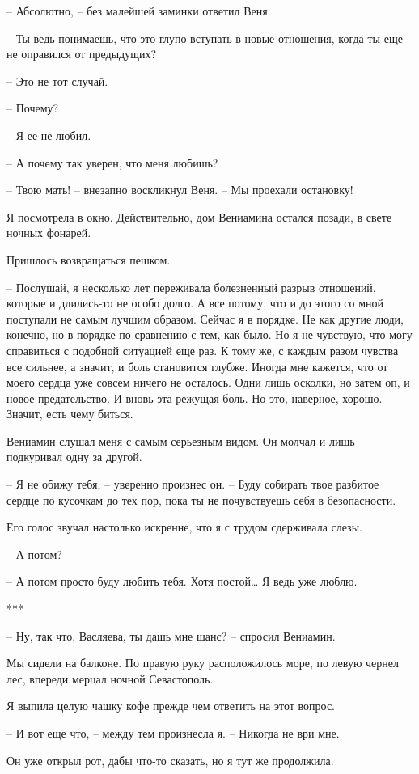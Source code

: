 \documentclass[
]{book}
\begin{document}
-- Абсолютно, -- без малейшей заминки ответил Веня.

-- Ты ведь понимаешь, что это глупо вступать в новые отношения, когда ты еще не оправился от предыдущих?

-- Это не тот случай.

-- Почему?

-- Я ее не любил.

-- А почему так уверен, что меня любишь?

-- Твою мать! -- внезапно воскликнул Веня. -- Мы проехали остановку!

Я посмотрела в окно. Действительно, дом Вениамина остался позади, в свете ночных фонарей.

Пришлось возвращаться пешком.

-- Послушай, я несколько лет переживала болезненный разрыв отношений, которые и длились-то не особо долго. А все потому, что и до этого со мной поступали не самым лучшим образом. Сейчас я в порядке. Не как другие люди, конечно, но в порядке по сравнению с тем, как было. Но я не чувствую, что могу справиться с подобной ситуацией еще раз. К тому же, с каждым разом чувства все сильнее, а значит, и боль становится глубже. Иногда мне кажется, что от моего сердца уже совсем ничего не осталось. Одни лишь осколки, но затем оп, и новое предательство. И вновь эта режущая боль. Но это, наверное, хорошо. Значит, есть чему биться.

Вениамин слушал меня с самым серьезным видом. Он молчал и лишь подкуривал одну за другой.

-- Я не обижу тебя, -- уверенно произнес он. -- Буду собирать твое разбитое сердце по кусочкам до тех пор, пока ты не почувствуешь себя в безопасности.

Его голос звучал настолько искренне, что я с трудом сдерживала слезы.

-- А потом?

-- А потом просто буду любить тебя. Хотя постой\ldots{} Я ведь уже люблю.

***

-- Ну, так что, Васляева, ты дашь мне шанс? -- спросил Вениамин.

Мы сидели на балконе. По правую руку расположилось море, по левую чернел лес, впереди мерцал ночной Севастополь.

Я выпила целую чашку кофе прежде чем ответить на этот вопрос.

-- И вот еще что, -- между тем произнесла я. -- Никогда не ври мне.

Он уже открыл рот, дабы что-то сказать, но я тут же продолжила.
\end{document}
